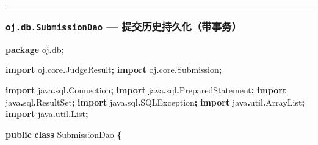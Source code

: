 \documentclass[
  11pt,
]{ctexart}
\newenvironment{Shaded}{\begin{snugshade}}{\end{snugshade}}
\newcommand{\ImportTok}[1]{#1}
\newcommand{\KeywordTok}[1]{\textcolor[rgb]{0.13,0.29,0.53}{\textbf{#1}}}
\newcommand{\NormalTok}[1]{#1}
\newcommand{\OperatorTok}[1]{\textcolor[rgb]{0.81,0.36,0.00}{\textbf{#1}}}
\begin{document}
\begin{center}\rule{0.5\linewidth}{0.5pt}\end{center}

\hypertarget{oj.db.submissiondao-ux63d0ux4ea4ux5386ux53f2ux6301ux4e45ux5316ux5e26ux4e8bux52a1}{%
\subsubsection{\texorpdfstring{\texttt{oj.db.SubmissionDao} ---
提交历史持久化（带事务）}{oj.db.SubmissionDao --- 提交历史持久化（带事务）}}\label{oj.db.submissiondao-ux63d0ux4ea4ux5386ux53f2ux6301ux4e45ux5316ux5e26ux4e8bux52a1}}

\begin{Shaded}
\begin{Highlighting}[]
\KeywordTok{package}\ImportTok{ oj}\OperatorTok{.}\ImportTok{db}\OperatorTok{;}

\KeywordTok{import} \ImportTok{oj}\OperatorTok{.}\ImportTok{core}\OperatorTok{.}\ImportTok{JudgeResult}\OperatorTok{;}
\KeywordTok{import} \ImportTok{oj}\OperatorTok{.}\ImportTok{core}\OperatorTok{.}\ImportTok{Submission}\OperatorTok{;}

\KeywordTok{import} \ImportTok{java}\OperatorTok{.}\ImportTok{sql}\OperatorTok{.}\ImportTok{Connection}\OperatorTok{;}
\KeywordTok{import} \ImportTok{java}\OperatorTok{.}\ImportTok{sql}\OperatorTok{.}\ImportTok{PreparedStatement}\OperatorTok{;}
\KeywordTok{import} \ImportTok{java}\OperatorTok{.}\ImportTok{sql}\OperatorTok{.}\ImportTok{ResultSet}\OperatorTok{;}
\KeywordTok{import} \ImportTok{java}\OperatorTok{.}\ImportTok{sql}\OperatorTok{.}\ImportTok{SQLException}\OperatorTok{;}
\KeywordTok{import} \ImportTok{java}\OperatorTok{.}\ImportTok{util}\OperatorTok{.}\ImportTok{ArrayList}\OperatorTok{;}
\KeywordTok{import} \ImportTok{java}\OperatorTok{.}\ImportTok{util}\OperatorTok{.}\ImportTok{List}\OperatorTok{;}

\KeywordTok{public} \KeywordTok{class}\NormalTok{ SubmissionDao }\OperatorTok{\{}


\end{Highlighting}
\end{Shaded}
\end{document}
